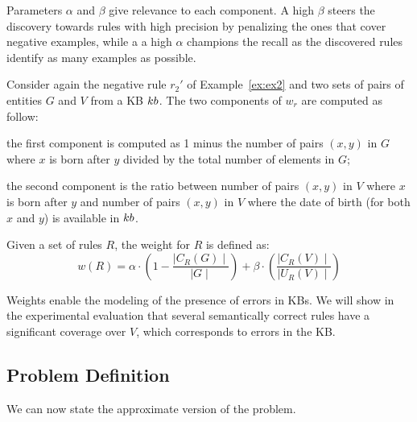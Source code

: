 Parameters $\alpha$ and $\beta$ give relevance to each component. A high $\beta$ steers the discovery towards rules with high precision by penalizing the ones that cover negative examples, %
while a a high $\alpha$ champions the recall as the discovered rules identify as many examples as possible.

\begin{example}
	Consider again the negative rule $r_2'$ of Example~\ref{ex:ex2} and two sets of pairs of entities $G$ and $V$ from a KB ${\sc kb}$. The two components of $w_r$ are computed as follow:
	\begin{inparaenum}[\itshape1)]
		\item the first component is computed as 1 minus the number of pairs $(x,y)$ in $G$ where
		$x$ is born after $y$ divided by the total number of elements in $G$;
		\item the second component is the ratio between number of pairs $(x,y)$ in $V$ where $x$ is born after $y$ and number of pairs $(x,y)$ in $V$ where the date of birth (for both $x$ and $y$) is available in ${\sc kb}$.
	\end{inparaenum}
\end{example}

\begin{definition}
	Given a set of rules $R$, the weight for $R$ is defined as:
	\begin{equation*}
	w(R) = \alpha \cdot (1-\frac{\mid C_{R}(G)\mid}{\mid G \mid}) +\beta \cdot (\frac{\mid C_{R}(V) \mid}{\mid U_{R}(V)\mid})
	\end{equation*}
\end{definition}

Weights enable the modeling  of the presence of errors in KBs. We will show in the experimental evaluation that several semantically correct rules have a significant coverage over $V$, which corresponds to errors in the KB. 


\subsection{Problem Definition} \label{sec:krd_prob_def}
We can now state the approximate version of the problem.

